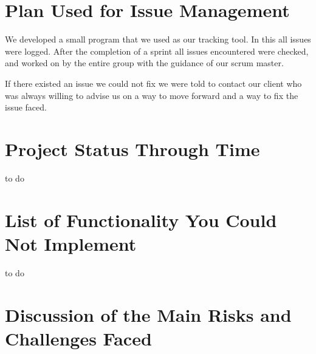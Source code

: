 \documentclass{article}
\begin{document}
\newpage
\section{Plan Used for Issue Management}
We developed a small program that we used as our tracking tool. In this all issues were logged. After the completion of a sprint all issues encountered were checked, and worked on by the entire group with the guidance of our scrum master. 


If there existed an issue we could not fix we were told to contact our client who was always willing to advise us on a way to move forward and a way to fix the issue faced.

\section{Project Status Through Time}
to do
\newpage
\section{List of Functionality You Could Not Implement}
to do
\newpage
\section{Discussion of the Main Risks and Challenges Faced}
\end{document}
